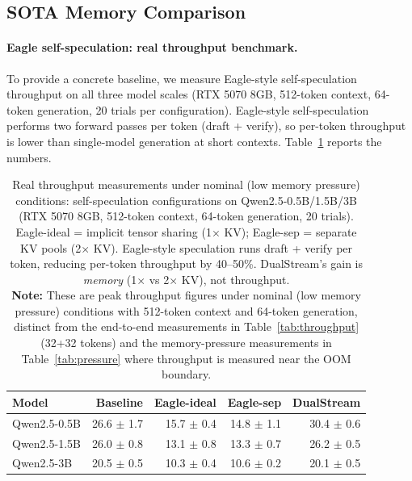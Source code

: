 \documentclass[review]{elsarticle}
\theoremstyle{definition}
\theoremstyle{remark}
\begin{document}
\subsection{SOTA Memory Comparison}
\label{sec:sota-memory}

\paragraph{Eagle self-speculation: real throughput benchmark.}
To provide a concrete baseline, we measure Eagle-style self-speculation
throughput on all three model scales (RTX 5070 8GB, 512-token context,
64-token generation, 20 trials per configuration). Eagle-style
self-speculation performs two forward passes per token (draft + verify),
so per-token throughput is lower than single-model generation at short
contexts. Table~\ref{tab:sota-throughput} reports the numbers.

\begin{table}[t]
\centering
\caption{Real throughput measurements under nominal (low memory pressure) conditions: self-speculation configurations on
Qwen2.5-0.5B/1.5B/3B (RTX 5070 8GB, 512-token context, 64-token generation, 20 trials). \\
Eagle-ideal = implicit tensor sharing (1$\times$ KV); Eagle-sep = separate KV pools (2$\times$ KV). Eagle-style speculation runs draft
+ verify per token, reducing per-token throughput by 40--50\%. DualStream's
gain is \emph{memory} (1$\times$ vs 2$\times$ KV), not throughput.\\
\textbf{Note:} These are peak throughput figures under nominal (low memory pressure) conditions with 512-token context and 64-token generation, distinct from the end-to-end measurements in Table~\ref{tab:throughput} (32+32 tokens) and the memory-pressure measurements in Table~\ref{tab:pressure} where throughput is measured near the OOM boundary.}
\label{tab:sota-throughput}
\begin{tabular}{lrrrr}
\toprule
\textbf{Model} & \textbf{Baseline} & \textbf{Eagle-ideal} & \textbf{Eagle-sep} & \textbf{DualStream} \\
\midrule
Qwen2.5-0.5B  & 26.6 $\pm$ 1.7 & 15.7 $\pm$ 0.4 & 14.8 $\pm$ 1.1 & 30.4 $\pm$ 0.6 \\
Qwen2.5-1.5B  & 26.0 $\pm$ 0.8 & 13.1 $\pm$ 0.8 & 13.3 $\pm$ 0.7 & 26.2 $\pm$ 0.5 \\
Qwen2.5-3B    & 20.5 $\pm$ 0.5 & 10.3 $\pm$ 0.4 & 10.6 $\pm$ 0.2 & 20.1 $\pm$ 0.5 \\
\bottomrule
\end{tabular}
\end{table}
\end{document}
